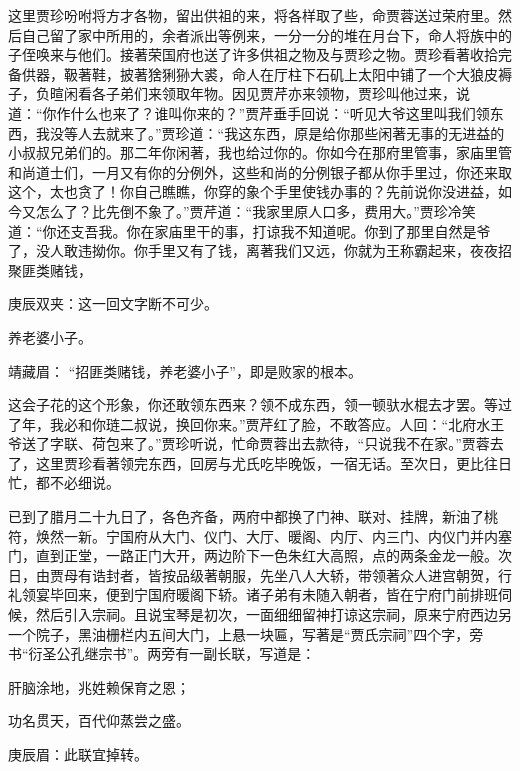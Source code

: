 \begin{parag}
    这里贾珍吩咐将方才各物，留出供祖的来，将各样取了些，命贾蓉送过荣府里。然后自己留了家中所用的，余者派出等例来，一分一分的堆在月台下，命人将族中的子侄唤来与他们。接著荣国府也送了许多供祖之物及与贾珍之物。贾珍看著收拾完备供器，靸著鞋，披著猞猁狲大裘，命人在厅柱下石矶上太阳中铺了一个大狼皮褥子，负暄闲看各子弟们来领取年物。因见贾芹亦来领物，贾珍叫他过来，说道：“你作什么也来了？谁叫你来的？”贾芹垂手回说：“听见大爷这里叫我们领东西，我没等人去就来了。”贾珍道：“我这东西，原是给你那些闲著无事的无进益的小叔叔兄弟们的。那二年你闲著，我也给过你的。你如今在那府里管事，家庙里管和尚道士们，一月又有你的分例外，这些和尚的分例银子都从你手里过，你还来取这个，太也贪了！你自己瞧瞧，你穿的象个手里使钱办事的？先前说你没进益，如今又怎么了？比先倒不象了。”贾芹道：“我家里原人口多，费用大。”贾珍冷笑道：“你还支吾我。你在家庙里干的事，打谅我不知道呢。你到了那里自然是爷了，没人敢违拗你。你手里又有了钱，离著我们又远，你就为王称霸起来，夜夜招聚匪类赌钱，\begin{note}庚辰双夹：这一回文字断不可少。\end{note}养老婆小子。\begin{note}靖藏眉： “招匪类赌钱，养老婆小子”，即是败家的根本。\end{note}这会子花的这个形象，你还敢领东西来？领不成东西，领一顿驮水棍去才罢。等过了年，我必和你琏二叔说，换回你来。”贾芹红了脸，不敢答应。人回：“北府水王爷送了字联、荷包来了。”贾珍听说，忙命贾蓉出去款待，“只说我不在家。”贾蓉去了，这里贾珍看著领完东西，回房与尤氏吃毕晚饭，一宿无话。至次日，更比往日忙，都不必细说。
\end{parag}


\begin{parag}
    已到了腊月二十九日了，各色齐备，两府中都换了门神、联对、挂牌，新油了桃符，焕然一新。宁国府从大门、仪门、大厅、暖阁、内厅、内三门、内仪门并内塞门，直到正堂，一路正门大开，两边阶下一色朱红大高照，点的两条金龙一般。次日，由贾母有诰封者，皆按品级著朝服，先坐八人大轿，带领著众人进宫朝贺，行礼领宴毕回来，便到宁国府暖阁下轿。诸子弟有未随入朝者，皆在宁府门前排班伺候，然后引入宗祠。且说宝琴是初次，一面细细留神打谅这宗祠，原来宁府西边另一个院子，黑油栅栏内五间大门，上悬一块匾，写著是“贾氏宗祠”四个字，旁书“衍圣公孔继宗书”。两旁有一副长联，写道是：
\end{parag}


\begin{poem}
    \begin{pl}肝脑涂地，兆姓赖保育之恩；\end{pl}

    \begin{pl}功名贯天，百代仰蒸尝之盛。\end{pl}
    \begin{note}庚辰眉：此联宜掉转。\end{note}
\end{poem}


